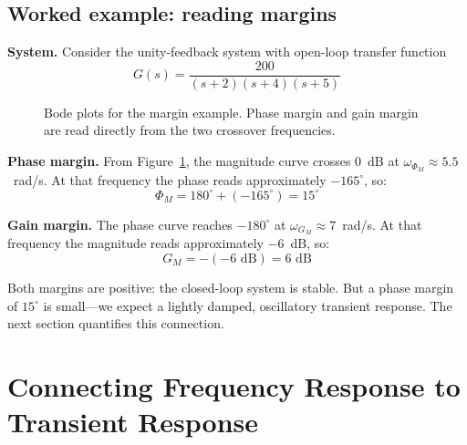 \documentclass[../../book.tex]{subfiles}
\begin{document}
\subsection{Worked example: reading margins}
\label{sec:margin_example}

\textbf{System.}  Consider the unity-feedback system with open-loop transfer
function
\begin{equation}
  G(s) = \frac{200}{(s+2)(s+4)(s+5)}
  \label{eq:ex_loop}
\end{equation}

\begin{figure}[htbp]
  \caption{Bode plots for the margin example.  Phase margin and gain margin
    are read directly from the two crossover frequencies.}
  \label{fig:ex_bode}
\end{figure}

\textbf{Phase margin.}  From Figure~\ref{fig:ex_bode}, the magnitude curve
crosses 0~dB at $\omega_{\Phi_M} \approx 5.5$~rad/s.  At that frequency the
phase reads approximately $-165^\circ$, so:
\[
  \Phi_M = 180^\circ + (-165^\circ) = 15^\circ
\]

\textbf{Gain margin.}  The phase curve reaches $-180^\circ$ at
$\omega_{G_M} \approx 7$~rad/s.  At that frequency the magnitude reads
approximately $-6$~dB, so:
\[
  G_M = -(-6\text{ dB}) = 6\text{ dB}
\]

Both margins are positive: the closed-loop system is stable.  But a phase
margin of $15^\circ$ is small---we expect a lightly damped, oscillatory
transient response.  The next section quantifies this connection.

\section{Connecting Frequency Response to Transient Response}
\label{sec:connect}
\end{document}
